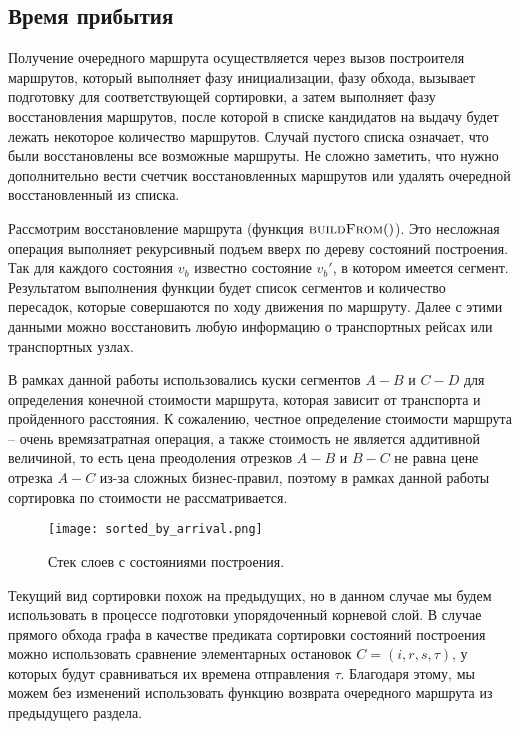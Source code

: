 \FloatBarrier
\subsection{Время прибытия}
Получение очередного маршрута осуществляется через вызов построителя маршрутов, который выполняет фазу инициализации, фазу обхода, вызывает подготовку для соответствующей сортировки, а затем выполняет фазу восстановления маршрутов, после которой в списке кандидатов на выдачу будет лежать некоторое количество маршрутов. Случай пустого списка означает, что были восстановлены все возможные маршруты. Не сложно заметить, что нужно дополнительно вести счетчик восстановленных маршрутов или удалять очередной восстановленный из списка.

Рассмотрим восстановление маршрута (функция $\Call{buildFrom}$). Это несложная операция выполняет рекурсивный подъем вверх по дереву состояний построения. Так для каждого состояния $v_b$ известно состояние $v_b'$, в котором имеется сегмент. Результатом выполнения функции будет список сегментов и количество пересадок, которые совершаются по ходу движения по маршруту. Далее с этими данными можно восстановить любую информацию о транспортных рейсах или транспортных узлах.

В рамках данной работы использовались куски сегментов $A-B$ и $C-D$ для определения конечной стоимости маршрута, которая зависит от транспорта и пройденного расстояния. К сожалению, честное определение стоимости маршрута -- очень времязатратная операция, а также стоимость не является аддитивной величиной, то есть цена преодоления отрезков $A-B$ и $B-C$ не равна цене отрезка $A-C$ из-за сложных бизнес-правил, поэтому в рамках данной работы сортировка по стоимости не рассматривается.

\begin{figure}[!h]
	\centering
	\texttt{[image: sorted\_by\_arrival.png]}
	\caption{Стек слоев с состояниями построения.}\label{fig8}
\end{figure}

Текущий вид сортировки похож на предыдущих, но в данном случае мы будем использовать в процессе подготовки упорядоченный корневой слой. В случае прямого обхода графа в качестве предиката сортировки состояний построения можно использовать сравнение элементарных остановок $C=(i, r, s, \tau)$, у которых будут сравниваться их времена отправления $\tau$. Благодаря этому, мы можем без изменений использовать функцию возврата очередного маршрута из предыдущего раздела.

